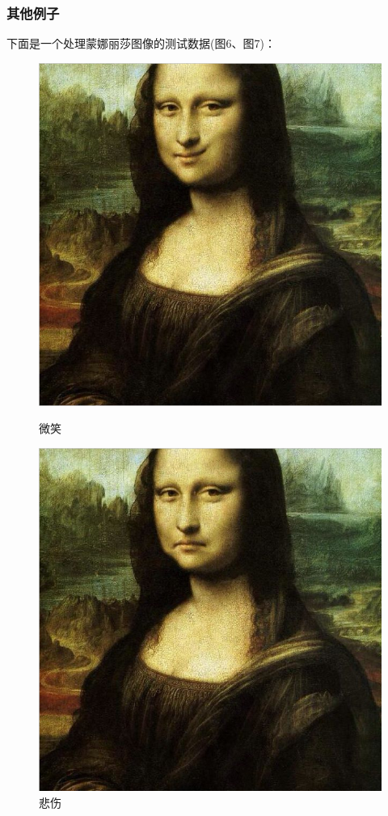 \documentclass{article}
\begin{document}
\subsubsection{其他例子}
	
		下面是一个处理蒙娜丽莎图像的测试数据(图6、图7)：
	
	\begin{figure}
		\begin{minipage}[H]{0.5\linewidth}
			\centering
			\includegraphics[scale=0.35]{art1.png}
			\caption{微笑}
		\end{minipage}%
		\begin{minipage}[H]{0.5\linewidth}
			\centering
			\includegraphics[scale=0.35]{art2.png}
			\caption{悲伤}
		\end{minipage}
	\end{figure}
	
\end{document}

